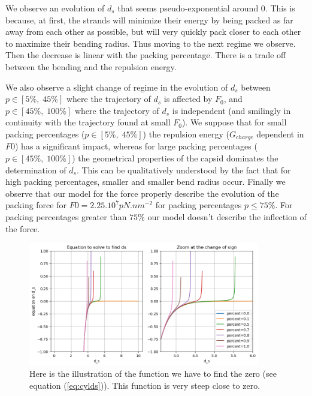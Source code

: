 \documentclass{article}
\begin{document}
We observe an evolution of $d_s$ that seems pseudo-exponential around $0$. This is because, at first, the strands will minimize their energy by being packed as far away from each other as possible, but will very quickly pack closer to each other to maximize their bending radius. Thus moving to the next regime we observe. Then the decrease is linear with the packing percentage. There is a trade off between the bending and the repulsion energy.

We also observe a slight change of regime in the evolution of $d_s$ between $p \in \left[5\%,\;45\%\right]$ where the trajectory of $d_s$ is affected by $F_0$, and $p \in \left[45\%,\;100\%\right]$ where the trajectory of $d_s$ is independent (and smilingly in continuity with the trajectory found at small $F_0$). We suppose that for small packing percentages ($p \in \left[5\%,\;45\%\right]$) the repulsion energy ($G_{charge}$ dependent in $F0$) has a significant impact, whereas for large packing percentages ($p \in \left[45\%,\;100\%\right]$) the geometrical properties of the capsid dominates the determination of $d_s$. This can be qualitatively understood by the fact that for high packing percentages, smaller and smaller bend radius occur. Finally we observe that our model for the force properly describe the evolution of the packing force for $F0=2.25.10^7pN.nm^{-2}$ for packing percentages $p \leq 75\%$. For packing percentages greater than $75\%$ our model doesn't describe the inflection of the force.

\begin{figure}
    \centering
    \includegraphics[width=0.9\textwidth]{Fig_Equation_cyl.png}
    \caption{Here is the illustration of the function we have to find the zero (see equation (\ref{eq:cylds})). This function is very steep close to zero.}
    \label{fig:equation-cylinder}
\end{figure}
\end{document}
